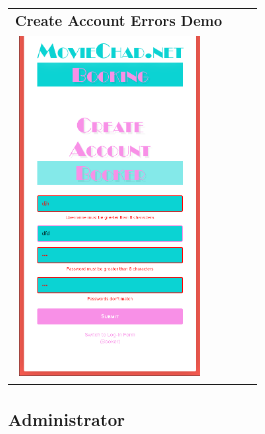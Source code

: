\documentclass[11pt, english]{article}
\begin{document}
	\begin{center}
        	\scriptsize
        \begin{longtable}{p{5cm}p{5cm}p{5cm}}
                \textbf{Create Account Errors Demo}\\
		\includegraphics[width=5cm,height=9cm]{CS993_IMG/login6.png}\\
        \end{longtable}
        \end{center}

\newpage

		\subsubsection{Administrator}
\end{document}
